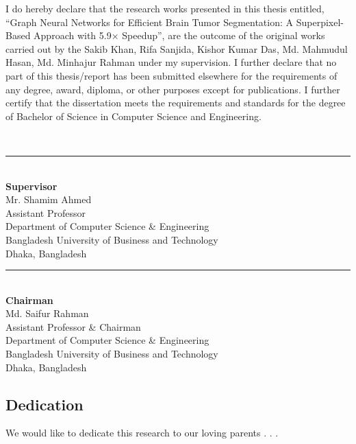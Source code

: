 \documentclass{article}
\begin{document}
I do hereby declare that the research works presented in this thesis entitled, “Graph Neural Networks for Efficient Brain Tumor Segmentation:
     A Superpixel-Based Approach with 5.9× Speedup”, are the outcome of the original works carried out by the Sakib Khan, Rifa Sanjida, Kishor Kumar Das, Md. Mahmudul Hasan, Md. Minhajur Rahman under my supervision. I further declare that no part of this thesis/report has been submitted elsewhere for the requirements of any degree, award, diploma, or other purposes except for publications. I further certify that the dissertation meets the requirements and standards for the degree of Bachelor of Science in Computer Science and Engineering.

\vspace{6mm}

\null\hfill\\
\noindent\rule{9.3cm}{0.2pt} \\ 
\textbf{Supervisor}\\
Mr. Shamim Ahmed \\
Assistant Professor \\
Department of Computer Science \& Engineering \\
Bangladesh University of Business and Technology\\
Dhaka, Bangladesh


\vspace{16mm}

\begin{flushleft}
\nopagebreak
\noindent\rule{9.3cm}{0.2pt} \\ 
\nopagebreak
\textbf{Chairman} \null\hfill  \\
\nopagebreak
Md. Saifur Rahman \\
\nopagebreak
Assistant Professor \& Chairman \\
\nopagebreak
Department of Computer Science \& Engineering \\
\nopagebreak
Bangladesh University of Business and Technology\\
\nopagebreak
Dhaka, Bangladesh\\
\end{flushleft}
\cleardoublepage

\begin{center}
    \section*{Dedication}
\end{center}
We would like to dedicate this research to our loving parents . . .
\cleardoublepage
\end{document}
